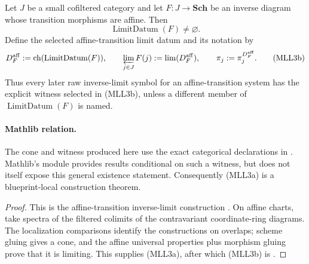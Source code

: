 \begin{lemma}
  \label{lemma:nagata-affine-transition-limit-datum-exists}

  Let $J$ be a small cofiltered category and let
  $F\colon J\to\mathbf{Sch}$ be an inverse diagram whose transition
  morphisms are affine.  Then
  \[
    \operatorname{LimitDatum}(F)\neq\varnothing.                 \tag{MLL3a}
  \]
  Define the selected affine-transition limit datum and its notation by
  \[
    D_F^{\mathrm{aff}}
      :=\operatorname{ch}(\operatorname{LimitDatum}(F)),\qquad
    \varprojlim_{j\in J}F(j):=\lim(D_F^{\mathrm{aff}}),\qquad
    \pi_j:=\pi_j^{D_F^{\mathrm{aff}}}.                           \tag{MLL3b}
  \]
  Thus every later raw inverse-limit symbol for an affine-transition system
  has the explicit witness selected in (MLL3b), unless a different member of
  $\operatorname{LimitDatum}(F)$ is named.

  \paragraph{Mathlib relation.}
  The cone and witness produced here use the exact categorical declarations
  in .  Mathlib's
  \texttt{}
  module provides results conditional on such a witness, but does not itself
  expose this general existence statement.  Consequently (MLL3a) is a
  blueprint-local construction theorem.
\end{lemma}

\begin{proof}
  This is the affine-transition inverse-limit construction
  \cite[\href{https://stacks.math.columbia.edu/tag/01ZM}{Tag 01ZM}]
  {stacks-project}.  On affine charts, take spectra of the filtered colimits
  of the contravariant coordinate-ring diagrams.  The localization
  comparisons identify the constructions on overlaps; scheme gluing gives a
  cone, and the affine universal properties plus morphism gluing prove that
  it is limiting.  This supplies (MLL3a), after which (MLL3b) is
  .
\end{proof}

